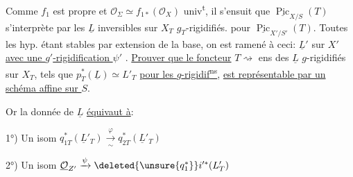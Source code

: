 Comme $f_1$ est propre et $\mathcal O_\Sigma\simeq f_{1*}(\mathcal O_X)$ univ\textsuperscript{t}, il s'ensuit  que $\underline{\operatorname{Pic}}_{X/S}(T)$ s'interprète par les $\underline L$ inversibles sur $X_T$ $g_T$-rigidifiés.  pour $\underline{\operatorname{Pic}}_{X'/S'}(T)$. Toutes les hyp. étant stables par extension de la base, on est ramené à ceci: \uline{} $\underline L'$ sur $X'$ \uline{avec une $g'$-rigidification $\psi'$} . \uline{Prouver que le foncteur} $T\rightsquigarrow$ ens des $\underline L$ $g$-rigidifiés sur $X_T$, tels que $p_T^*(\underline L)\simeq L'_T$ \uline{pour les $g$-rigidif\textsuperscript{ns}}, \uline{est représentable par un schéma affine sur $S$}.


Or la donnée de $\underline L$ \uline{équivaut à}:

1°) Un isom $q_{1T}^*(\underline L'_T)\xrightarrow[\sim]{\varphi}q_{2T}^*(\underline L'_T)$

2°) Un isom $\underline{\mathcal O}_{Z'}\xrightarrow{\psi}\deleted{\unsure{q_1^*}}i'^*(L'_T)$

